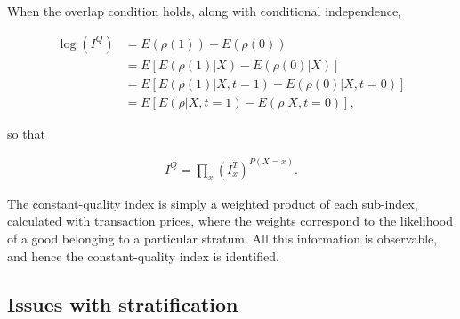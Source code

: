 \documentclass[]{article}
\begin{document}
When the overlap condition holds, along with conditional independence,

\begin{align*}
\log(I^{Q}) &= E(\rho(1)) - E(\rho(0)) \\
&= E[E(\rho(1) | X) - E(\rho(0) | X)] \\
&= E[E(\rho(1) | X, t = 1) - E(\rho(0) | X, t = 0)] \\
&= E[E(\rho | X, t = 1) - E(\rho | X, t = 0)],
\end{align*}

so that

\begin{align*}
I^{Q} = \prod_{x} (I^{T}_{x})^{P(X = x)}.
\end{align*}

The constant-quality index is simply a weighted product of each sub-index, calculated with transaction prices, where the weights correspond to the likelihood of a good belonging to a particular stratum. All this information is observable, and hence the constant-quality index is identified.

\hypertarget{issues-with-stratification}{%
\subsection{Issues with stratification}\label{issues-with-stratification}}
\end{document}
